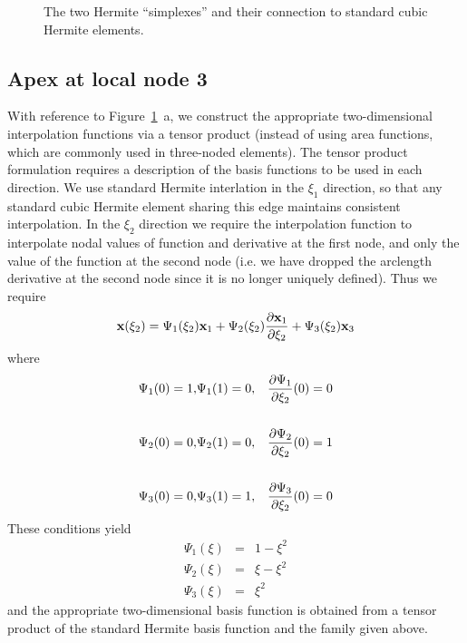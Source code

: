 \begin{figure}
\centering
 \caption[The two Hermite ``simplexes'']{The two Hermite ``simplexes'' and their connection to standard cubic Hermite 
elements.}
\label{fig:B1}
\end{figure}

\subsection{Apex at local node 3}
With reference to Figure~\ref{fig:B1}~a, we construct the appropriate
two-dimensional interpolation functions via a tensor product (instead of using
area functions, which are commonly used in three-noded elements).  The tensor
product formulation requires a description of the basis functions to be used
in each direction.  We use standard Hermite interlation in the $\xi_{1}$
direction, so that any standard cubic Hermite element sharing this edge
maintains consistent interpolation.  In the $\xi_{2}$ direction we require the
interpolation function to interpolate nodal values of function and derivative
at the first node, and only the value of the function at the second node (i.e.
we have dropped the arclength derivative at the second node since it is no
longer uniquely defined).  Thus we require
\begin{displaymath}
 {\bf x}(\xi_{2}) = \Psi_{1}(\xi_{2}){\bf x}_{1} + \Psi_{2}(\xi_{2}) 
   \dfrac{\partial {\bf x}_{1}}{\partial \xi_{2}}   + \Psi_{3}(\xi_{2}) {\bf x}_{3}
\end{displaymath}  
where   
\begin{eqnarray*}
 \Psi_{1} (0)  = 1,&\Psi_{1} (1)=0,& \dfrac{\partial \Psi_{1}}{\partial \xi_{2}}  (0) = 0\\  \\
 \Psi_{2} (0)  = 0,&\Psi_{2} (1)=0,& \dfrac{\partial \Psi_{2}}{\partial \xi_{2}} (0) = 1\\
 \\  
 \Psi_{3} (0)  = 0,&\Psi_{3} (1)=1,& \dfrac{\partial \Psi_{3}}{\partial \xi_{2}}  (0) = 0
\end{eqnarray*}  
These conditions yield
\begin{eqnarray*}
 \Psi_{1} (\xi) & = & 1 - \xi^{2}\\ 
 \Psi_{2} (\xi) & = & \xi - \xi^{2}\\ 
 \Psi_{3} (\xi) & = & \xi^{2}
\end{eqnarray*} 
and the appropriate two-dimensional basis function is obtained from a tensor
product of the standard Hermite basis function and the family given above.

